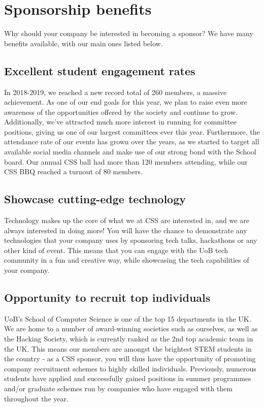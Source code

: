 \documentclass{article}
\begin{document}
\newpage

\section*{Sponsorship benefits}

Why should your company be interested in becoming a sponsor?
We have many benefits available, with our main ones listed below.

\subsection*{Excellent student engagement rates}

In 2018-2019, we reached a new record total of 260 members, a massive achievement. As one of our end goals for this year, we plan to raise even more awareness of the opportunities offered by the society and continue to grow.
Additionally, we've attracted much more interest in running for committee positions, giving us one of our largest committees ever this year.
Furthermore, the attendance rate of our events has grown over the years, as we started to target all available social media channels and make use of our strong bond with the School board. 
Our annual CSS ball had more than 120 members attending, while our CSS BBQ reached a turnout of 80 members.

\subsection*{Showcase cutting-edge technology}

Technology makes up the core of what we at CSS are interested in, and we are always interested in doing more!
You will have the chance to demonstrate any technologies that your company uses by sponsoring tech talks, hackathons or any other kind of event.
This means that you can engage with the UoB tech community in a fun and creative way, while showcasing the tech capabilities of your company.

\subsection*{Opportunity to recruit top individuals}

UoB’s School of Computer Science is one of the top 15 departments in the UK. We are home to a number of award-winning societies such as ourselves, as well as the Hacking Society, which is currently ranked as the 2nd top academic team in the UK.
This means our members are amongst the brightest STEM students in the country - as a CSS sponsor, you will thus have the opportunity of promoting company recruitment schemes to highly skilled individuals.
Previously, numerous students have applied and successfully gained positions in summer programmes and/or graduate schemes run by companies who have engaged with them throughout the year. 
\end{document}

